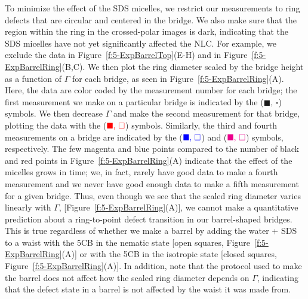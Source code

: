 To minimize the effect of the SDS micelles, we restrict our measurements to ring defects that are circular and centered in the bridge.
We also make sure that the region within the ring in the crossed-polar images is dark, indicating that the SDS micelles have not yet significantly affected the NLC.
For example, we exclude the data in Figure~\ref{f:5-ExpBarrelTop}(E-H) and in Figure~\ref{f:5-ExpBarrelRing}(B,C).
We then plot the ring diameter scaled by the bridge height as a function of $\Gamma$ for each bridge, as seen in Figure~\ref{f:5-ExpBarrelRing}(A).
Here, the data are color coded by the measurement number for each bridge; the first measurement we make on a particular bridge is indicated by the (${\blacksquare,\, \square}$) symbols.
We then decrease $\Gamma$ and make the second measurement for that bridge, plotting the data with the (${\color{red} \blacksquare,\, \square}$) symbols.
Similarly, the third and fourth measurements on a bridge are indicated by the (${\color{blue} \blacksquare,\, \square}$) and (${\color{magenta} \blacksquare,\, \square}$) symbols, respectively.
The few magenta and blue points compared to the number of black and red points in Figure~\ref{f:5-ExpBarrelRing}(A) indicate that the effect of the micelles grows in time; we, in fact, rarely have good data to make a fourth measurement and we never have good enough data to make a fifth measurement for a given bridge.
Thus, even though we see that the scaled ring diameter varies linearly with $\Gamma$, [Figure~\ref{f:5-ExpBarrelRing}(A)], we cannot make a quantitative prediction about a ring-to-point defect transition in our barrel-shaped bridges.
This is true regardless of whether we make a barrel by adding the water + SDS to a waist with the 5CB in the nematic state [open squares, Figure~\ref{f:5-ExpBarrelRing}(A)] or with the 5CB in the isotropic state [closed squares, Figure~\ref{f:5-ExpBarrelRing}(A)].
In addition, note that the protocol used to make the barrel does not affect how the scaled ring diameter depends on $\Gamma$, indicating that the defect state in a barrel is not affected by the waist it was made from.


